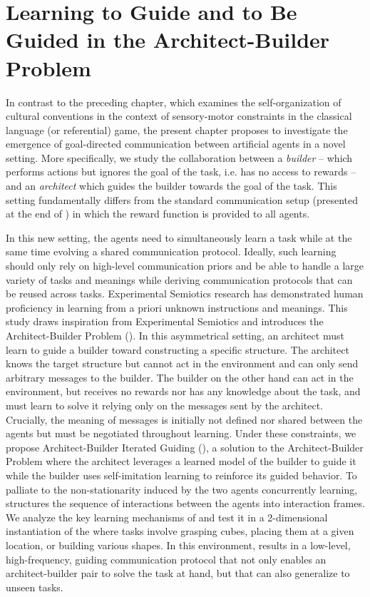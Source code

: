 \chapter{Learning to Guide and to Be Guided in the Architect-Builder Problem}
\label{chap:abig}
\minitoc


In contrast to the preceding chapter, which examines the self-organization of cultural conventions in the context of sensory-motor constraints in the classical language (or referential) game, the present chapter proposes to investigate the emergence of goal-directed communication between artificial agents in a novel setting. More specifically, we study the collaboration between a \emph{builder} -- which performs actions but ignores the goal of the task, i.e. has no access to rewards -- and an \emph{architect} which guides the builder towards the goal of the task. This setting fundamentally differs from the standard \marl communication setup (presented at the end of ) in which the reward function is provided to all agents. 

In this new setting, the agents need to simultaneously learn a task while at the same time evolving a shared communication protocol. Ideally, such learning should only rely on high-level communication priors and be able to handle a large variety of tasks and meanings while deriving communication protocols that can be reused across tasks.
Experimental Semiotics research has demonstrated human proficiency in learning from a priori unknown instructions and meanings. This study draws inspiration from Experimental Semiotics and introduces the Architect-Builder Problem (\abp). In this asymmetrical setting, an architect must learn to guide a builder toward constructing a specific structure. The architect knows the target structure but cannot act in the environment and can only send arbitrary messages to the builder. The builder on the other hand can act in the environment, but receives no rewards nor has any knowledge about the task, and must learn to solve it relying only on the messages sent by the architect. Crucially, the meaning of messages is initially not defined nor shared between the agents but must be negotiated throughout learning.
Under these constraints, we propose Architect-Builder Iterated Guiding (\abig), a solution to the Architect-Builder Problem where the architect leverages a learned model of the builder to guide it while the builder uses self-imitation learning to reinforce its guided behavior. To palliate to the non-stationarity induced by the two agents concurrently learning, \abig structures the sequence of interactions between the agents into interaction frames. We analyze the key learning mechanisms of \abig and test it in a 2-dimensional instantiation of the \abp where tasks involve grasping cubes, placing them at a given location, or building various shapes. In this environment, \abig results in a low-level, high-frequency, guiding communication protocol that not only enables an architect-builder pair to solve the task at hand, but that can also generalize to unseen tasks.

